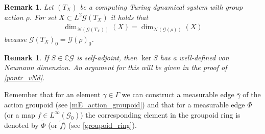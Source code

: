 \documentclass[12pt,a4paper]{scrartcl}
\theoremstyle{plain}
\newtheorem{Remark}[Theorem]{Remark}
\theoremstyle{definition}
\newcommand{\C}{\mathbb{C}} %
\newcommand{\2}{\mathbb{Z} / 2 \mathbb{Z}}
\newcommand{\G}{\mathcal{G}}
\newcommand{\1}{\bar{1}}
\newcommand{\0}{\bar{0}}
\begin{document}
\begin{Remark}
	Let $(T_X)$ be a computing Turing dynamical system with group action $\rho$. For set $X \subset L^2 \G (T_X)$ it holds that
	\begin{align*}
		\dim_{\mathcal{N}(\G(T_X))}(X) = \dim_{\mathcal{N}(\G(\rho))}(X)
	\end{align*}
	because $\G(T_X)_0 = \G(\rho)_0$.
\end{Remark}
\begin{Remark}
	If $S \in \C\G$ is self-adjoint, then $\ker S$ has a well-defined von Neumann dimension. An argument for this will be given in the proof of \ref{pontr_vNd}.
\end{Remark}

Remember that for an element $\gamma \in \Gamma$ we can construct a measurable edge $\bar{\gamma}$ of the action groupoid (see \ref{mE_action_groupoid}) and that for a measurable edge $\Phi$ (or a map $f \in L^\infty (\G_0)$) the corresponding element in the groupoid ring is denoted by $\tilde{\Phi}$ (or $\tilde{f}$) (see \ref{groupoid_ring}).
\end{document}
